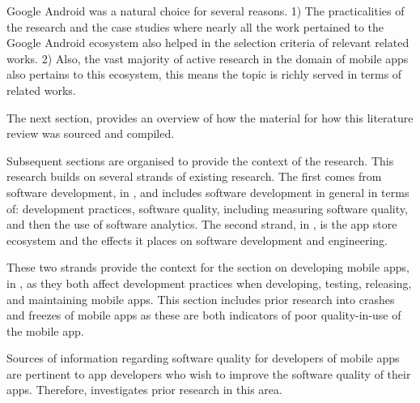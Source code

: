 Google Android was a natural choice for several reasons. 1) The practicalities of the research and the case studies where nearly all the work pertained to the Google Android ecosystem also helped in the selection criteria of relevant related works. 2) Also, the vast majority of active research in the domain of mobile apps also pertains to this ecosystem, this means the topic is richly served in terms of related works.

The next section,  provides an overview of how the material for how this literature review was sourced and compiled.

Subsequent sections are organised to provide the context of the research. This research builds on several strands of existing research. The first comes from software development, in , and includes software development in general in terms of: development practices, software quality, including measuring software quality, and then the use of software analytics. The second strand, in , is the app store ecosystem and the effects it places on software development and engineering.

These two strands provide the context for the section on developing mobile apps, in , as they both affect development practices when developing, testing, releasing, and maintaining mobile apps. This section includes prior research into crashes and freezes of mobile apps as these are both indicators of poor quality-in-use of the mobile app.

Sources of information regarding software quality for developers of mobile apps are pertinent to app developers who wish to improve the software quality of their apps. Therefore,  investigates prior research in this area.



